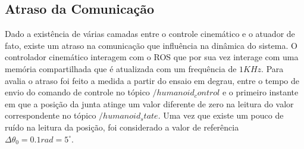 



\subsection{Atraso da Comunicação}

Dado a existência de várias camadas entre o controle cinemático e o atuador de fato, existe um atraso na comunicação que influência na dinâmica do sistema. O controlador cinemático interagem com o ROS que por sua vez interage com uma memória compartilhada que é atualizada com um frequência de $1 KHz$. Para avalia o atraso foi feito a medida a partir do ensaio em degrau, entre o tempo de envio do comando de controle no tópico $/humanoid_control$ e o primeiro instante em que a posição da junta atinge um valor diferente de zero na leitura do valor correspondente no tópico $/humanoid_state$. Uma vez que existe um pouco de ruído na leitura da posição, foi considerado a valor de referência $\Delta\theta_0 = 0.1 rad = 5^\circ$.





